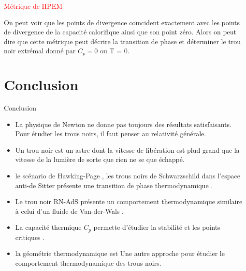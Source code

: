\documentclass{beamer}
\begin{document}
\begin{frame}
\textcolor{red}{Métrique de HPEM}
\begin{block}{}
	On peut voir que les points de divergence coïncident exactement avec les points de
	divergence de la capacité calorifique ainsi que son point zéro. Alors on peut dire que cette
	métrique peut décrire la transition de phase et déterminer le trou noir extrémal donné
	par $C_{p} = 0$ ou T = 0.\\
\end{block}
\end{frame}
\section{Conclusion}
\begin{frame}
\begin{block}{Conclusion}
\begin{itemize}
	\item La physique de Newton ne donne pas toujours des résultats
	satisfaisants. Pour étudier les trous noirs, il faut penser au
	relativité générale.
	\item Un trou noir est un astre dont la vitesse de libération est plud grand que la vitesse de la lumière de sorte que rien ne se que échappé.
	\item le scénario de Hawking-Page , les trous noirs de Schwarzschild dans
	l’espace anti-de Sitter présente une transition de phase thermodynamique .
	\item Le trou noir RN-AdS présente un comportement
	thermodynamique similaire à celui d’un fluide de
	Van-der-Wals .
	\item La capacité thermique $ C_{p}$
	permette d'étudier la stabilité et les points critiques .
	\item  la géométrie thermodynamique est Une autre approche pour étudier le comportement thermodynamique des trous noirs.
\end{itemize}
\end{block}

\end{frame}
\end{document}
